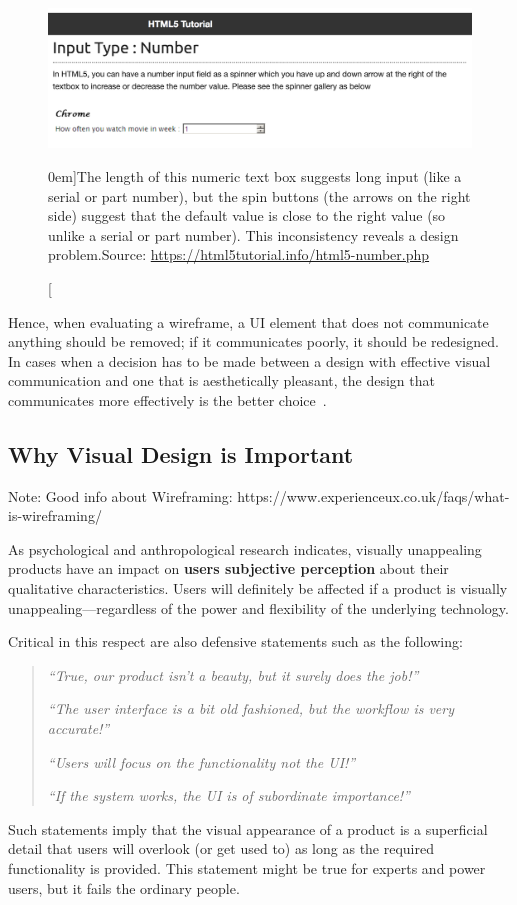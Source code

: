 \begin{figure}%
	\centering
  \includegraphics[width=1.0\textwidth]{../figures/inconsistent_inputfield.png}
  \caption[][0em]{The length of this numeric text box suggests long input (like a serial or part number), but the spin buttons (the arrows on the right side) suggest that the default value is close to the right value (so unlike a serial or part number). This inconsistency reveals a design problem.\newline Source: \url{https://html5tutorial.info/html5-number.php}}
  \label{fig:inconsistent_inputfield}
\end{figure}

Hence, when evaluating a wireframe, a UI element that does not communicate anything should be removed; if it communicates poorly, it should be redesigned. In cases when a decision has to be made between a design with effective visual communication and one that is aesthetically pleasant, the design that communicates more effectively is the better choice~\citep{mckay:2013}. 


\subsection{Why Visual Design is Important} %
\label{sub:why_visual_design_is_important}

Note: Good info about Wireframing: https://www.experienceux.co.uk/faqs/what-is-wireframing/

As psychological and anthropological research indicates, visually unappealing products have an impact on \textbf{users subjective perception} about their qualitative characteristics. 
Users will definitely be affected if a product is visually unappealing---regardless of the power and flexibility of the underlying technology. 

Critical in this respect are also defensive statements such as the following:
\begin{quote}
	\emph{``True, our product isn't a beauty, but it surely does the job!''}
	\par
	\emph{``The user interface is a bit old fashioned, but the workflow is very accurate!''}
	\par
	\emph{``Users will focus on the functionality not the UI!''}
	\par
	\emph{``If the system works, the UI is of subordinate importance!''}
\end{quote}
Such statements imply that the visual appearance of a product is a superficial detail that users will overlook (or get used to) as long as the required functionality is provided. 
This statement might be true for experts and power users, but it fails the ordinary people.

